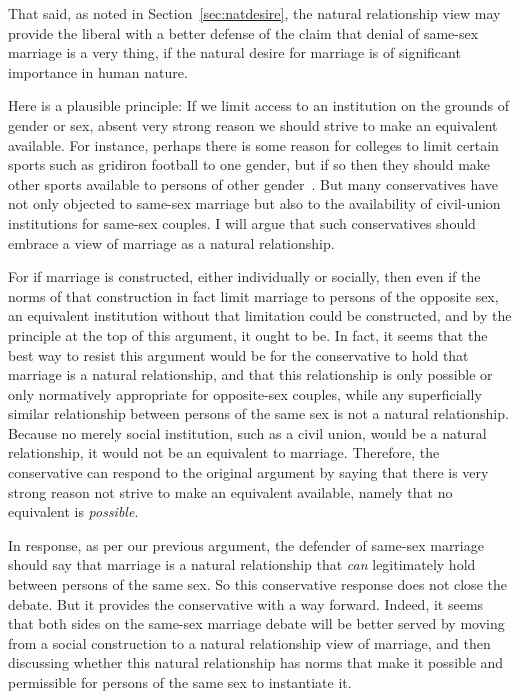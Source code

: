 That said, as noted in Section~\ref{sec:natdesire}, the natural relationship view may provide the liberal with 
a better defense of the claim that denial of same-sex marriage is a very thing, if the natural desire for marriage
is of significant importance in human nature.

Here is a plausible principle: If we limit access to an institution on the grounds of gender or sex, absent very strong reason we should strive to make an equivalent
available. For instance, perhaps there is some reason for colleges to limit certain sports such as gridiron football to one gender, but if so then they should make other sports available
to persons of other gender~\parencite{FrancisSports}.
But many conservatives have not only objected to same-sex marriage but also to the availability of civil-union institutions for same-sex couples. I will argue that
such conservatives should embrace a view of marriage as a natural relationship.

For if marriage is constructed, either individually or socially, then even if the norms of that construction in fact limit marriage to persons of the opposite sex, an
equivalent institution without that limitation could be constructed, and by the principle at the top of this argument, it ought to be. In fact, it seems that
the best way to resist this argument would be for the conservative to hold that marriage is a natural relationship, and that this relationship is only possible
or only normatively appropriate for opposite-sex couples, while any superficially similar relationship between persons of the same sex is not a natural relationship.
Because no merely social institution, such as a civil union, would be a natural relationship, it would not be an equivalent to marriage. Therefore, the conservative can respond to the
original argument by saying that there is very strong reason not strive to make an equivalent available, namely that no equivalent is \textit{possible}.

In response, as per our previous argument, the defender of same-sex marriage should say that marriage is a natural relationship that \textit{can} legitimately
hold between persons of the same sex. So this conservative response does not close the debate. But it provides the conservative with a way forward. Indeed,
it seems that both sides on the same-sex marriage debate will be better served by moving from a social construction to a natural relationship view of marriage, and then discussing whether
this natural relationship has norms that make it possible and permissible for persons of the same sex to instantiate it.

